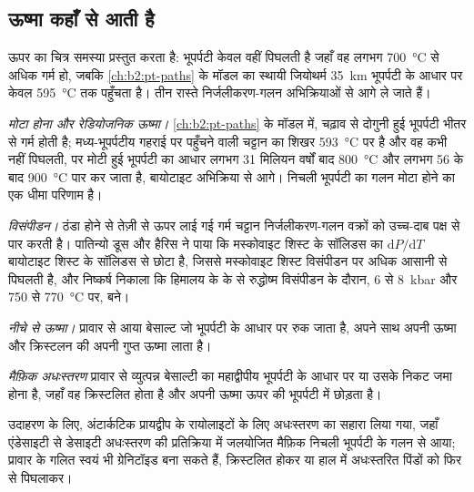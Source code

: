 \subsection*{ऊष्मा कहाँ से आती है}

ऊपर का चित्र समस्या प्रस्तुत करता है: भूपर्पटी केवल वहीं पिघलती है जहाँ वह लगभग
\qty{700}{\celsius} से अधिक गर्म हो, जबकि \cref{ch:b2:pt-paths} के मॉडल का स्थायी जियोथर्म
\qty{35}{km} भूपर्पटी के आधार पर केवल \qty{595}{\celsius} तक पहुँचता है। तीन रास्ते
निर्जलीकरण-गलन अभिक्रियाओं से आगे ले जाते हैं।

\emph{मोटा होना और रेडियोजनिक ऊष्मा।} \cref{ch:b2:pt-paths} के मॉडल में, चढ़ाव से दोगुनी हुई
भूपर्पटी भीतर से गर्म होती है; मध्य-भूपर्पटीय गहराई पर पहुँचने वाली चट्टान का शिखर
\qty{593}{\celsius} पर है और वह कभी नहीं पिघलती, पर मोटी हुई भूपर्पटी का आधार लगभग 31 मिलियन वर्षों बाद
\qty{800}{\celsius} और लगभग 56 के बाद \qty{900}{\celsius} पार कर जाता है, बायोटाइट
अभिक्रिया से आगे। निचली भूपर्पटी का गलन मोटा होने का एक धीमा परिणाम है।

\emph{विसंपीडन।} ठंडा होने से तेज़ी से ऊपर लाई गई गर्म चट्टान
निर्जलीकरण-गलन वक्रों को उच्च-दाब पक्ष से पार करती है। पातिन्यो डूस और हैरिस ने पाया कि
मस्कोवाइट शिस्ट के सॉलिडस का $\mathrm{d}P/\mathrm{d}T$ बायोटाइट शिस्ट के सॉलिडस से छोटा है,
जिससे मस्कोवाइट शिस्ट विसंपीडन पर अधिक आसानी से पिघलती है, और
निष्कर्ष निकाला कि हिमालय के   के  से
रुद्धोष्म विसंपीडन के दौरान, 6 से \qty{8}{kbar} और 750 से \qty{770}{\celsius} पर, बने।

\emph{नीचे से ऊष्मा।} प्रावार से आया बेसाल्ट जो भूपर्पटी के आधार पर रुक जाता है, अपने साथ
अपनी ऊष्मा और क्रिस्टलन की अपनी गुप्त ऊष्मा लाता है।

\begin{definition}[मैफ़िक अधःस्तरण]\label{def:b2:crustal-melting:underplating}
\emph{मैफ़िक अधःस्तरण} प्रावार से व्युत्पन्न
बेसाल्टी  का महाद्वीपीय भूपर्पटी के आधार पर या उसके निकट जमा होना है, जहाँ वह क्रिस्टलित होता है और
अपनी ऊष्मा ऊपर की भूपर्पटी में छोड़ता है।
\end{definition}

उदाहरण के लिए, अंटार्कटिक प्रायद्वीप के रायोलाइटों के लिए अधःस्तरण का सहारा लिया गया,
जहाँ एंडेसाइटी से डेसाइटी  अधःस्तरण की प्रतिक्रिया में जलयोजित मैफ़िक निचली भूपर्पटी के
गलन से आया; प्रावार के गलित स्वयं भी ग्रेनिटॉइड बना सकते हैं,
क्रिस्टलित होकर या हाल में अधःस्तरित पिंडों को फिर से पिघलाकर।

